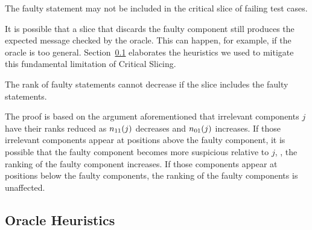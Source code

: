 \documentclass{article}
\begin{document}
\begin{theorem}
  The faulty statement may not be included in the critical slice of
  failing test cases.
\end{theorem}

It is possible that a slice that discards the faulty component still
produces the expected message checked by the oracle. This can happen,
for example, if the oracle is too
general. Section~\ref{sec:oracleheuristics} elaborates the heuristics
we used to mitigate this fundamental limitation of Critical Slicing.


\begin{theorem}
  The rank of faulty statements cannot decrease if the slice includes
  the faulty statements.
\end{theorem}

The proof is based on the argument aforementioned that irrelevant
components $j$ have their ranks reduced as $n_{11}(j)$ decreases and
$n_{01}(j)$ increases. If those irrelevant components appear at positions
above the faulty component, it is possible that the faulty component
becomes more suspicious relative to $j$, \ie{}, the ranking of the
faulty component increases. If those components appear at positions
below the faulty components, the ranking of the faulty components is
unaffected.


\subsection{Oracle Heuristics}
\label{sec:oracleheuristics}


\end{document}
